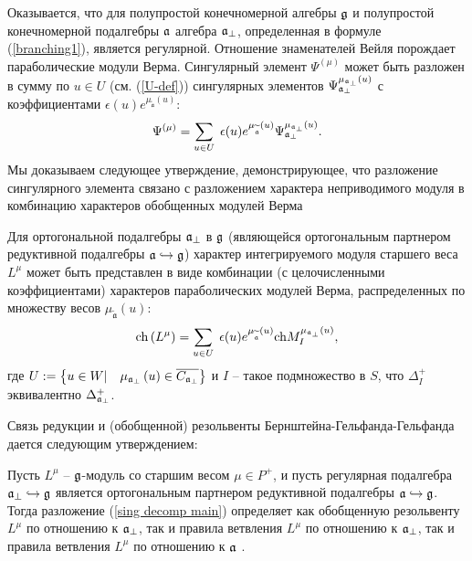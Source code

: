 \documentclass[14pt,autoref,href,facsimile
]{disser}
\begin{document}
Оказывается, что для полупростой конечномерной алгебры $\mathfrak{g}$  и полупростой конечномерной подалгебры $\mathfrak{a}$ алгебра $\mathfrak{a}_{\perp}$, определенная в формуле (\ref{branching1}), является регулярной. Отношение знаменателей Вейля порождает параболические модули Верма. Сингулярный элемент  $\Psi ^{\left( \mu \right) }$ может быть разложен в сумму по  $u\in U$ (см. (\ref{U-def})) сингулярных элементов $\Psi _{\frak{a}_{\perp }}^{\mu _{\frak{a}_{\perp }}\left( u\right) }$ с коэффициентами
$\epsilon (u)e^{\mu _{\widetilde{\mathfrak{a}}}\left( u\right) }$:
\begin{equation}
\Psi ^{\left( \mu \right) }=\sum_{u\in U}\;\epsilon (u)e^{\mu _{\widetilde{%
\mathfrak{a}}}\left( u\right) }\Psi _{\frak{a}_{\perp }}^{\mu _{\frak{a}%
_{\perp }}\left( u\right) }.  \label{sing decomp main}
\end{equation}
Мы доказываем следующее утверждение, демонстрирующее, что разложение сингулярного элемента связано с разложением характера неприводимого модуля в комбинацию характеров обобщенных модулей Верма
\begin{statement}
Для ортогональной подалгебры  $\frak{a}_{\perp }$ в $\frak{g}$ (являющейся ортогональным партнером редуктивной подалгебры $\frak{a}\hookrightarrow \frak{g}$) характер интегрируемого модуля старшего веса  $L^{\mu }$ может быть представлен в виде комбинации (с целочисленными коэффициентами) характеров параболических модулей Верма, распределенных по множеству весов $\mu _{\widetilde{\mathfrak{a}}}\left(
u\right)$:
\begin{equation}
\mathrm{ch}\left( L^{\mu }\right) =\sum_{u\in U}\;\epsilon (u)e^{\mu _{%
\widetilde{\frak{a}}}\left( u\right) }\mathrm{ch}M_{I}^{\mu _{\frak{a}%
_{\perp }}\left( u\right) },  \label{gen Weyl-Verma}
\end{equation}
где  $U:=\left\{ u\in W|\quad \mu _{\frak{a}_{\perp }}\left( u\right) \in
\overline{C_{\frak{a}_{\perp }}}\right\} $ и $I$ -- такое подмножество в  $S$, что $\Delta _{I}^{+}$ эквивалентно $\Delta _{\frak{a}_{\perp }}^{+}$.
\end{statement}

Связь редукции и (обобщенной) резольвенты Бернштейна-Гельфанда-Гельфанда дается следующим утверждением:
\begin{statement}
Пусть $L^{\mu }$ --  $\frak{g}$-модуль со старшим весом $\mu \in P^{+}$, и пусть регулярная подалгебра  $\mathfrak{a}_{\perp}\hookrightarrow \frak{g}$ является ортогональным партнером редуктивной подалгебры $\frak{a}\hookrightarrow \frak{g}$. Тогда разложение (\ref{sing decomp main}) определяет как обобщенную резольвенту $L^{\mu }$ по отношению к $\mathfrak{a}_{\perp}$, так и правила ветвления $L^{\mu }$ по отношению к $\mathfrak{a}_{\perp}$, так и правила ветвления $L^{\mu }$ по отношению к $\mathfrak{a}$ .
\end{statement}
\end{document}
